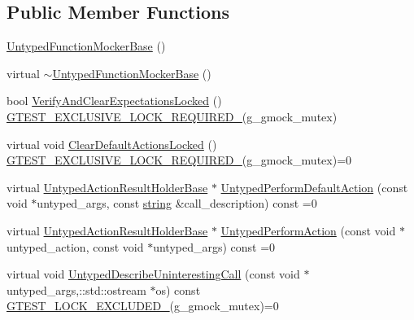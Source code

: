 \subsection*{Public Member Functions}
\begin{DoxyCompactItemize}
\item 
\hyperlink{classtesting_1_1internal_1_1_untyped_function_mocker_base_aedfa95e65d80936e4dff040140513b36}{Untyped\+Function\+Mocker\+Base} ()
\item 
virtual \hyperlink{classtesting_1_1internal_1_1_untyped_function_mocker_base_a6badd47a3fe2a439ef98aa91bf73d721}{$\sim$\+Untyped\+Function\+Mocker\+Base} ()
\item 
bool \hyperlink{classtesting_1_1internal_1_1_untyped_function_mocker_base_a3f1d62a1662a3daa2895b3af963be269}{Verify\+And\+Clear\+Expectations\+Locked} () \hyperlink{gtest-port_8h_a149f693bd59fa1bc937af54c0cdcb32f}{G\+T\+E\+S\+T\+\_\+\+E\+X\+C\+L\+U\+S\+I\+V\+E\+\_\+\+L\+O\+C\+K\+\_\+\+R\+E\+Q\+U\+I\+R\+E\+D\+\_\+}(g\+\_\+gmock\+\_\+mutex)
\item 
virtual void \hyperlink{classtesting_1_1internal_1_1_untyped_function_mocker_base_a40ddd95736946a7951033aa89a7b617f}{Clear\+Default\+Actions\+Locked} () \hyperlink{gtest-port_8h_a149f693bd59fa1bc937af54c0cdcb32f}{G\+T\+E\+S\+T\+\_\+\+E\+X\+C\+L\+U\+S\+I\+V\+E\+\_\+\+L\+O\+C\+K\+\_\+\+R\+E\+Q\+U\+I\+R\+E\+D\+\_\+}(g\+\_\+gmock\+\_\+mutex)=0
\item 
virtual \hyperlink{classtesting_1_1internal_1_1_untyped_action_result_holder_base}{Untyped\+Action\+Result\+Holder\+Base} $\ast$ \hyperlink{classtesting_1_1internal_1_1_untyped_function_mocker_base_a2cb149456cd559d5b0615f2310b235e3}{Untyped\+Perform\+Default\+Action} (const void $\ast$untyped\+\_\+args, const \hyperlink{namespacetesting_1_1internal_a8e8ff5b11e64078831112677156cb111}{string} \&call\+\_\+description) const =0
\item 
virtual \hyperlink{classtesting_1_1internal_1_1_untyped_action_result_holder_base}{Untyped\+Action\+Result\+Holder\+Base} $\ast$ \hyperlink{classtesting_1_1internal_1_1_untyped_function_mocker_base_ada5a72303863d0aa655b66338b8efea5}{Untyped\+Perform\+Action} (const void $\ast$untyped\+\_\+action, const void $\ast$untyped\+\_\+args) const =0
\item 
virtual void \hyperlink{classtesting_1_1internal_1_1_untyped_function_mocker_base_aeb80e61406142e87f94fab10873e20ce}{Untyped\+Describe\+Uninteresting\+Call} (const void $\ast$untyped\+\_\+args,\+::std\+::ostream $\ast$os) const \hyperlink{gtest-port_8h_a69abff5a4efdd07bd5faebe3dd318d06}{G\+T\+E\+S\+T\+\_\+\+L\+O\+C\+K\+\_\+\+E\+X\+C\+L\+U\+D\+E\+D\+\_\+}(g\+\_\+gmock\+\_\+mutex)=0

\end{DoxyCompactItemize}
